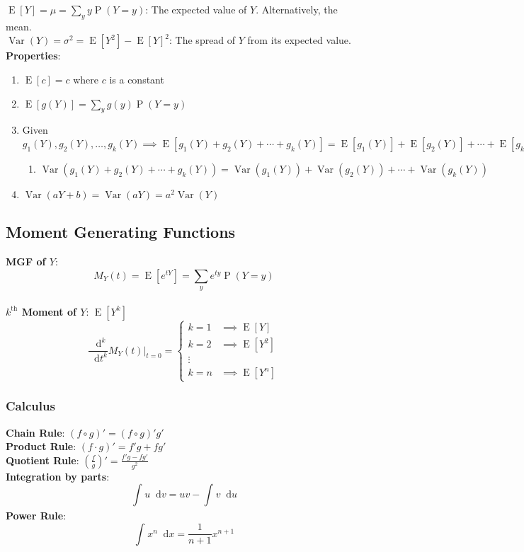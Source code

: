 \documentclass[12pt]{article}
\newcommand{\defn}[1]{\textbf{#1}:}
\newcommand{\pr}[1]{\operatorname{P}(#1)}
\newcommand{\var}[1]{\operatorname{Var}(#1)}
\newcommand{\expt}[1]{\operatorname{E}[#1]}
\newcommand*\diff{\mathop{}\!\mathrm{d}}
\newcommand{\drv}[3]{\frac{\diff#1^{#3}}{\diff#2^{#3}}}
\newcommand{\intv}[4]{\int_{#3}^{#4} #1 \diff #2}
\begin{document}
\noindent\defn{$\expt{Y} = \mu = \sum_{y}y\pr{Y=y}$}
The expected value of $Y$. Alternatively, the mean.\\
\defn{$\var{Y} = \sigma^2 = \expt{Y^2}-\expt{Y}^2$}
The spread of $Y$ from its expected value.\\

\defn{Properties}
\begin{enumerate}[label=(\roman*)]
    \item $\expt{c} = c$ where $c$ is a constant
    \item $\expt{g(Y)} = \sum_{y}g(y)\pr{Y=y}$
    \item Given $g_1(Y), g_2(Y), \ldots, g_k(Y) 
    \implies \expt{g_1(Y) + g_2(Y) + \cdots + g_k(Y)} = \expt{g_1(Y)} + \expt{g_2(Y)} + \cdots + \expt{g_k(Y)}$
        \begin{enumerate}
            \item $\var{g_1(Y) + g_2(Y) + \cdots + g_k(Y)} = \var{g_1(Y)} + \var{g_2(Y)} + \cdots + \var{g_k(Y)}$
        \end{enumerate}
    \item $\var{aY+b} = \var{aY} = a^2\var{Y}$
\end{enumerate}

\subsection{Moment Generating Functions}
\defn{MGF of $Y$} \[
    M_Y(t) = \expt{e^{tY}} = \sum_{y}e^{ty}\pr{Y=y}
\]\\
\defn{$k^{\text{th}}$ Moment of $Y$} $\expt{Y^k}$\\
\[
    \drv{}{t}{k}M_Y(t)\bigg\rvert_{t=0} = \begin{cases}
        k = 1 & \implies \expt{Y}\\
        k = 2 & \implies  \expt{Y^2}\\
        \vdots\\
        k = n & \implies \expt{Y^n}
    \end{cases}
\]
\subsubsection{Calculus}
\defn{Chain Rule} $(f\circ g)' = (f\circ g)'g'$\\
\defn{Product Rule} $(f\cdot g)' = f'g + fg'$\\
\defn{Quotient Rule} $(\frac{f}{g})' = \frac{f'g-fg'}{g^2}$\\
\defn{Integration by parts} \[
    \intv{u}{v}{}{} = uv - \intv{v}{u}{}{}
\]
\defn{Power Rule} \[
    \intv{x^n}{x}{}{} = \frac{1}{n+1}x^{n+1}
\]
\newpage
\end{document}
